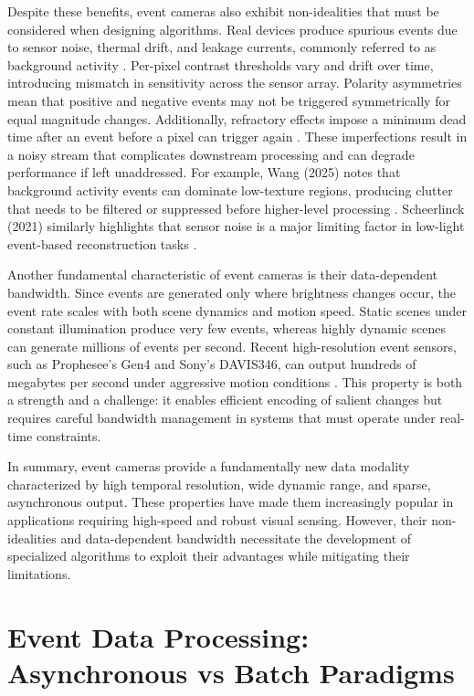 Despite these benefits, event cameras also exhibit non-idealities that must be considered when designing algorithms. Real devices produce spurious events due to sensor noise, thermal drift, and leakage currents, commonly referred to as background activity \cite{Gallego2020Survey}. Per-pixel contrast thresholds vary and drift over time, introducing mismatch in sensitivity across the sensor array. Polarity asymmetries mean that positive and negative events may not be triggered symmetrically for equal magnitude changes. Additionally, refractory effects impose a minimum dead time after an event before a pixel can trigger again \cite{Delbruck2020}. These imperfections result in a noisy stream that complicates downstream processing and can degrade performance if left unaddressed. For example, Wang (2025) notes that background activity events can dominate low-texture regions, producing clutter that needs to be filtered or suppressed before higher-level processing \cite{Wang2025Thesis}. Scheerlinck (2021) similarly highlights that sensor noise is a major limiting factor in low-light event-based reconstruction tasks \cite{Scheerlinck2021Thesis}.

Another fundamental characteristic of event cameras is their data-dependent bandwidth. Since events are generated only where brightness changes occur, the event rate scales with both scene dynamics and motion speed. Static scenes under constant illumination produce very few events, whereas highly dynamic scenes can generate millions of events per second. Recent high-resolution event sensors, such as Prophesee’s Gen4 and Sony’s DAVIS346, can output hundreds of megabytes per second under aggressive motion conditions \cite{Finateu2020}. This property is both a strength and a challenge: it enables efficient encoding of salient changes but requires careful bandwidth management in systems that must operate under real-time constraints.

In summary, event cameras provide a fundamentally new data modality characterized by high temporal resolution, wide dynamic range, and sparse, asynchronous output. These properties have made them increasingly popular in applications requiring high-speed and robust visual sensing. However, their non-idealities and data-dependent bandwidth necessitate the development of specialized algorithms to exploit their advantages while mitigating their limitations.

\section{Event Data Processing: Asynchronous vs Batch Paradigms}

